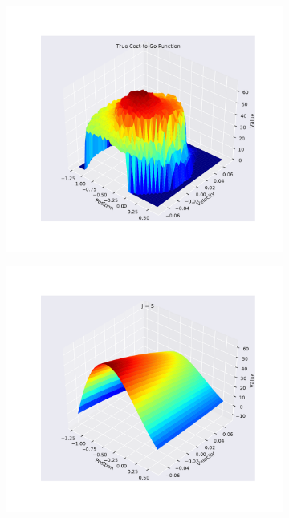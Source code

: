 \documentclass{article}
\begin{document}
\begin{figure}
    \centering
    \begin{subfigure}{.49\linewidth}
        \centering
        \includegraphics[width=\linewidth]{Figures/true_value_function.pdf}
    \end{subfigure}
    \begin{subfigure}{.49\linewidth}
        \centering
        \includegraphics[width=\linewidth]{Figures/rbf_value_function_5.pdf}
    \end{subfigure}


\end{figure}
\end{document}
